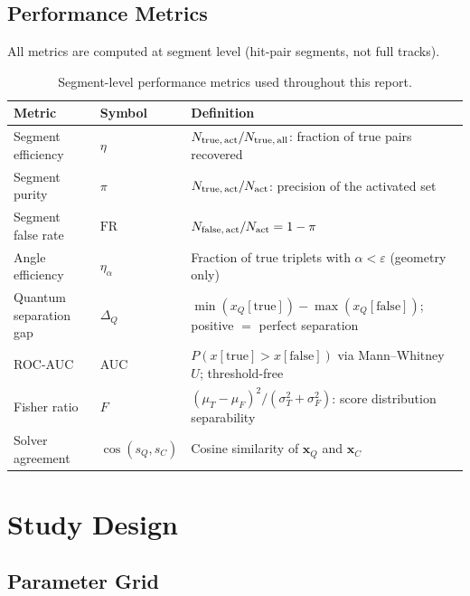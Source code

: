 \documentclass[11pt,a4paper]{article}
\newcommand{\eps}{\varepsilon}
\begin{document}
\subsection{Performance Metrics}
\label{sec:theory:metrics}

All metrics are computed at segment level (hit-pair segments, not full tracks).

\begin{table}[H]
  \centering
  \caption{Segment-level performance metrics used throughout this report.}
  \label{tab:metrics}
  \begin{tabular}{lp{2.8cm}p{7cm}}
    \toprule
    Metric & Symbol & Definition \\
    \midrule
    Segment efficiency & $\eta$ &
      $N_{\rm true,\,act}/N_{\rm true,\,all}$: fraction of true pairs recovered \\
    Segment purity & $\pi$ &
      $N_{\rm true,\,act}/N_{\rm act}$: precision of the activated set \\
    Segment false rate & $\mathrm{FR}$ &
      $N_{\rm false,\,act}/N_{\rm act} = 1-\pi$ \\
    Angle efficiency & $\eta_\alpha$ &
      Fraction of true triplets with $\alpha<\eps$ (geometry only) \\
    Quantum separation gap & $\Delta_Q$ &
      $\min(x_Q[\mathrm{true}])-\max(x_Q[\mathrm{false}])$;
      positive $=$ perfect separation \\
    ROC-AUC & AUC &
      $P(x[\mathrm{true}]>x[\mathrm{false}])$ via Mann--Whitney~$U$;
      threshold-free \\
    Fisher ratio & $F$ &
      $(\mu_T-\mu_F)^2/(\sigma_T^2+\sigma_F^2)$: score distribution separability \\
    Solver agreement & $\cos(s_Q,s_C)$ &
      Cosine similarity of $\mathbf{x}_Q$ and $\mathbf{x}_C$ \\
    \bottomrule
  \end{tabular}
\end{table}

\section{Study Design}
\label{sec:design}

\subsection{Parameter Grid}
\end{document}
